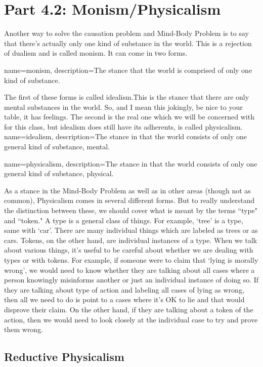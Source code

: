\section{Part 4.2: Monism/Physicalism}

Another way to solve the causation problem and Mind-Body Problem is to say that there’s actually only one kind of substance in the world. This is a rejection of dualism and is called \gls{monism}. It can come in two forms.

{
name=monism,
description={The stance that the world is comprised of only one kind of substance.}
}


The first of these forms is called \Gls{idealism}.This is the stance that there are only mental substances in the world. So, and I mean this jokingly, be nice to your table, it has feelings. The second is the real one which we will be concerned with for this class, but idealism does still have its adherents, is called \Gls{physicalism}. 
{
name=idealism,
description={The stance in that the world consists of only one general kind of substance, mental.}
}

{
name=physicalism,
description={The stance in that the world consists of only one general kind of substance, physical.}
}


As a stance in the Mind-Body Problem as well as in other areas (though not as common), Physicalism comes in several different forms. But to really understand the distinction between these, we should cover what is meant by the terms ``type" and ``token." A type is a general class of things. For example, `tree' is a type, same with `car'. There are many individual things which are labeled as trees or as cars. Tokens, on the other hand, are individual instances of a type. When we talk about various things, it's useful to be careful about whether we are dealing with types or with tokens. For example, if someone were to claim that `lying is morally wrong', we would need to know whether they are talking about all cases where a person knowingly misinforms another or just an individual instance of doing so. If they are talking about type of action and labeling all cases of lying as wrong, then all we need to do is point to a cases where it's OK to lie and that would disprove their claim. On the other hand, if they are talking about a token of the action, then we would need to look closely at the individual case to try and prove them wrong.

\subsection{Reductive Physicalism}

